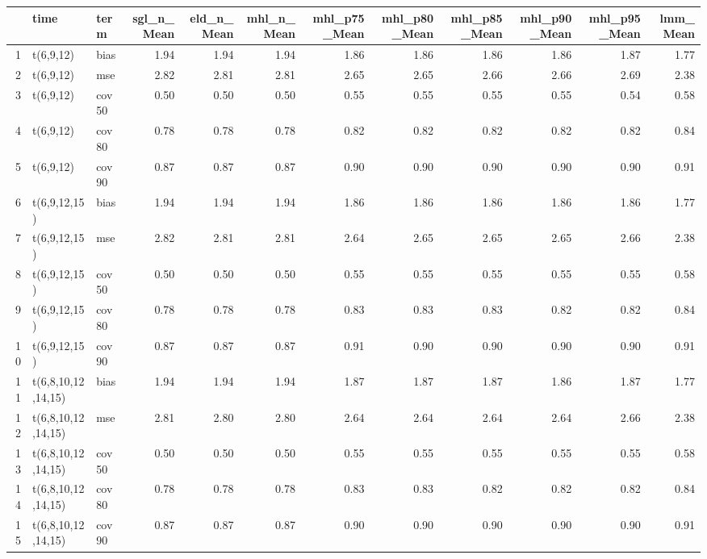 \begin{table}[ht]
\centering
\begin{tabular}{rllrrrrrrrrr}
  \hline
 & time & term & sgl\_n\_Mean & eld\_n\_Mean & mhl\_n\_Mean & mhl\_p75\_Mean & mhl\_p80\_Mean & mhl\_p85\_Mean & mhl\_p90\_Mean & mhl\_p95\_Mean & lmm\_Mean \\ 
  \hline
1 & t(6,9,12) & bias & 1.94 & 1.94 & 1.94 & 1.86 & 1.86 & 1.86 & 1.86 & 1.87 & 1.77 \\ 
  2 & t(6,9,12) & mse & 2.82 & 2.81 & 2.81 & 2.65 & 2.65 & 2.66 & 2.66 & 2.69 & 2.38 \\ 
  3 & t(6,9,12) & cov50 & 0.50 & 0.50 & 0.50 & 0.55 & 0.55 & 0.55 & 0.55 & 0.54 & 0.58 \\ 
  4 & t(6,9,12) & cov80 & 0.78 & 0.78 & 0.78 & 0.82 & 0.82 & 0.82 & 0.82 & 0.82 & 0.84 \\ 
  5 & t(6,9,12) & cov90 & 0.87 & 0.87 & 0.87 & 0.90 & 0.90 & 0.90 & 0.90 & 0.90 & 0.91 \\ 
  6 & t(6,9,12,15) & bias & 1.94 & 1.94 & 1.94 & 1.86 & 1.86 & 1.86 & 1.86 & 1.86 & 1.77 \\ 
  7 & t(6,9,12,15) & mse & 2.82 & 2.81 & 2.81 & 2.64 & 2.65 & 2.65 & 2.65 & 2.66 & 2.38 \\ 
  8 & t(6,9,12,15) & cov50 & 0.50 & 0.50 & 0.50 & 0.55 & 0.55 & 0.55 & 0.55 & 0.55 & 0.58 \\ 
  9 & t(6,9,12,15) & cov80 & 0.78 & 0.78 & 0.78 & 0.83 & 0.83 & 0.83 & 0.82 & 0.82 & 0.84 \\ 
  10 & t(6,9,12,15) & cov90 & 0.87 & 0.87 & 0.87 & 0.91 & 0.90 & 0.90 & 0.90 & 0.90 & 0.91 \\ 
  11 & t(6,8,10,12,14,15) & bias & 1.94 & 1.94 & 1.94 & 1.87 & 1.87 & 1.87 & 1.86 & 1.87 & 1.77 \\ 
  12 & t(6,8,10,12,14,15) & mse & 2.81 & 2.80 & 2.80 & 2.64 & 2.64 & 2.64 & 2.64 & 2.66 & 2.38 \\ 
  13 & t(6,8,10,12,14,15) & cov50 & 0.50 & 0.50 & 0.50 & 0.55 & 0.55 & 0.55 & 0.55 & 0.55 & 0.58 \\ 
  14 & t(6,8,10,12,14,15) & cov80 & 0.78 & 0.78 & 0.78 & 0.83 & 0.83 & 0.82 & 0.82 & 0.82 & 0.84 \\ 
  15 & t(6,8,10,12,14,15) & cov90 & 0.87 & 0.87 & 0.87 & 0.90 & 0.90 & 0.90 & 0.90 & 0.90 & 0.91 \\ 
   \hline
\end{tabular}
\end{table}
